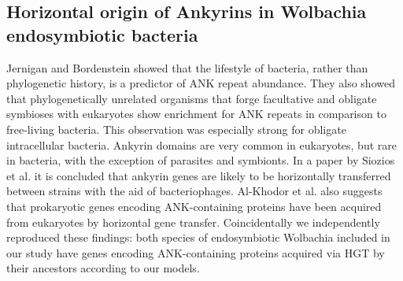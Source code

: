 \subsection{Horizontal origin of Ankyrins in Wolbachia endosymbiotic bacteria}
\label{horizontal_origin}
Jernigan and Bordenstein \cite{Jernigan2014} showed that the lifestyle of
bacteria, rather than phylogenetic history, is a predictor of ANK repeat
abundance. They also showed that phylogenetically unrelated organisms that
forge facultative and obligate symbioses with eukaryotes show enrichment for
ANK repeats in comparison to free-living bacteria. This observation was
especially strong for obligate intracellular bacteria. Ankyrin domains are very
common in eukaryotes, but rare in bacteria, with the exception of parasites and
symbionts. In a paper by Siozios et al. \cite{Siozios2013} it is concluded that
ankyrin genes are likely to be horizontally transferred between strains with
the aid of bacteriophages. Al-Khodor et al. \cite{Al-Khodor2010} also suggests
that prokaryotic genes encoding ANK-containing proteins have been acquired from
eukaryotes by horizontal gene transfer. Coincidentally we independently
reproduced these findings: both species of endosymbiotic Wolbachia included in
our study have genes encoding ANK-containing proteins acquired via HGT by their
ancestors according to our models.
